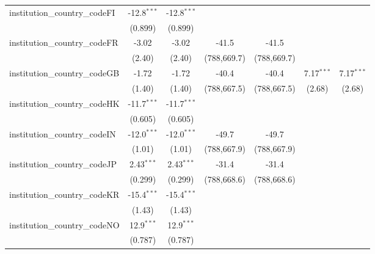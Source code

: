 \begin{tabular}{lcccccc}
   institution\_country\_codeFI          & -12.8$^{***}$ & -12.8$^{***}$ &             &             &               &   \\   
                                         & (0.899)       & (0.899)       &             &             &               &   \\   
   institution\_country\_codeFR          & -3.02         & -3.02         & -41.5       & -41.5       &               &   \\   
                                         & (2.40)        & (2.40)        & (788,669.7) & (788,669.7) &               &   \\   
   institution\_country\_codeGB          & -1.72         & -1.72         & -40.4       & -40.4       & 7.17$^{***}$  & 7.17$^{***}$\\   
                                         & (1.40)        & (1.40)        & (788,667.5) & (788,667.5) & (2.68)        & (2.68)\\   
   institution\_country\_codeHK          & -11.7$^{***}$ & -11.7$^{***}$ &             &             &               &   \\   
                                         & (0.605)       & (0.605)       &             &             &               &   \\   
   institution\_country\_codeIN          & -12.0$^{***}$ & -12.0$^{***}$ & -49.7       & -49.7       &               &   \\   
                                         & (1.01)        & (1.01)        & (788,667.9) & (788,667.9) &               &   \\   
   institution\_country\_codeJP          & 2.43$^{***}$  & 2.43$^{***}$  & -31.4       & -31.4       &               &   \\   
                                         & (0.299)       & (0.299)       & (788,668.6) & (788,668.6) &               &   \\   
   institution\_country\_codeKR          & -15.4$^{***}$ & -15.4$^{***}$ &             &             &               &   \\   
                                         & (1.43)        & (1.43)        &             &             &               &   \\   
   institution\_country\_codeNO          & 12.9$^{***}$  & 12.9$^{***}$  &             &             &               &   \\   
                                         & (0.787)       & (0.787)       &             &             &               &   \\   

\end{tabular}
